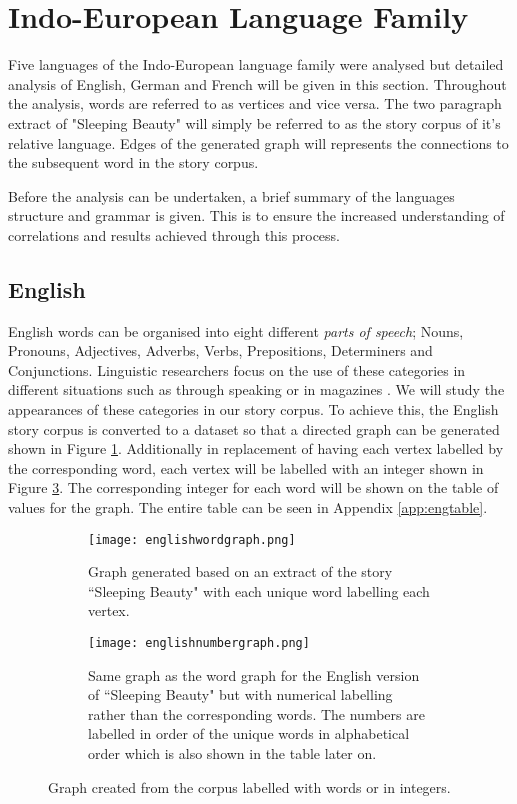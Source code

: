 \section{Indo-European Language Family}
Five languages of the Indo-European language family were analysed but detailed analysis of English, German and French will be given in this section. Throughout the analysis, words are referred to as vertices and vice versa. The two paragraph extract of "Sleeping Beauty" will simply be referred to as the story corpus of it's relative language. Edges of the generated graph will represents the connections to the subsequent word in the story corpus. 

Before the analysis can be undertaken, a brief summary of the languages structure and grammar is given. This is to ensure the increased understanding of correlations and results achieved through this process.

\subsection{English}
English words can be organised into eight different \emph{parts of speech}; Nouns, Pronouns, Adjectives, Adverbs, Verbs, Prepositions, Determiners and Conjunctions. Linguistic researchers focus on the use of these categories in different situations such as through speaking or in magazines \cite{khaisaeng2017study}. We will study the appearances of these categories in our story corpus. To achieve this, the English story corpus is converted to a dataset so that a directed graph can be generated shown in Figure \ref{fig:engword}. Additionally in replacement of having each vertex labelled by the corresponding word, each vertex will be labelled with an integer shown in Figure \ref{fig:engnum}. The corresponding integer for each word will be shown on the table of values for the graph. The entire table can be seen in Appendix \ref{app:engtable}.

\begin{figure}[H]
\centering
\begin{subfigure}{.45\textwidth}
	\texttt{[image: englishwordgraph.png]}
	\caption{Graph generated based on an extract of the story ``Sleeping Beauty" with each unique word labelling each vertex.}
	\label{fig:engword}
\end{subfigure}
\hfill
\begin{subfigure}{.45\textwidth}
	\texttt{[image: englishnumbergraph.png]}
	\caption{Same graph as the word graph for the English version of ``Sleeping Beauty" but with numerical labelling rather than the corresponding words. The numbers are labelled in order of the unique words in alphabetical order which is also shown in the table later on.}
	\label{fig:engnum}
\end{subfigure}
\caption{Graph created from the corpus labelled with words or in integers.}
\end{figure}

